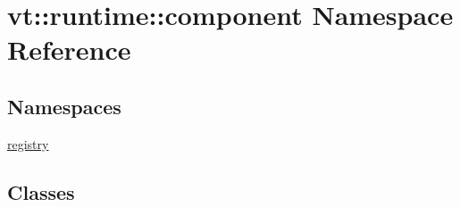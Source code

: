 \hypertarget{namespacevt_1_1runtime_1_1component}{}\section{vt\+:\+:runtime\+:\+:component Namespace Reference}
\label{namespacevt_1_1runtime_1_1component}
\subsection*{Namespaces}
\begin{DoxyCompactItemize}
\item 
 \hyperlink{namespacevt_1_1runtime_1_1component_1_1registry}{registry}
\end{DoxyCompactItemize}
\subsection*{Classes}

